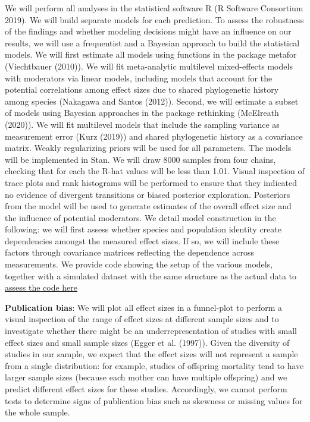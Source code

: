 \documentclass[]{article}
\begin{document}
We will perform all analyses in the statistical software R (R Software
Consortium 2019). We will build separate models for each prediction. To
assess the robustness of the findings and whether modeling decisions
might have an influence on our results, we will use a frequentist and a
Bayesian approach to build the statistical models. We will first
estimate all models using functions in the package metafor (Viechtbauer
(2010)). We will fit meta-analytic multilevel mixed-effects models with
moderators via linear models, including models that account for the
potential correlations among effect sizes due to shared phylogenetic
history among species (Nakagawa and Santos (2012)). Second, we will
estimate a subset of models using Bayesian approaches in the package
rethinking (McElreath (2020)). We will fit multilevel models that
include the sampling variance as measurement error (Kurz (2019)) and
shared phylogenetic history as a covariance matrix. Weakly regularizing
priors will be used for all parameters. The models will be implemented
in Stan. We will draw 8000 samples from four chains, checking that for
each the R-hat values will be less than 1.01. Visual inspection of trace
plots and rank histograms will be performed to ensure that they
indicated no evidence of divergent transitions or biased posterior
exploration. Posteriors from the model will be used to generate
estimates of the overall effect size and the influence of potential
moderators. We detail model construction in the following: we will first
assess whether species and population identity create dependencies
amongst the measured effect sizes. If so, we will include these factors
through covariance matrices reflecting the dependence across
measurements. We provide code showing the setup of the various models,
together with a simulated dataset with the same structure as the actual
data to
\href{https://github.com/dieterlukas/FemaleDominanceReproduction_MetaAnalysis}{assess
the code here}

\textbf{Publication bias}: We will plot all effect sizes in a
funnel-plot to perform a visual inspection of the range of effect sizes
at different sample sizes and to investigate whether there might be an
underrepresentation of studies with small effect sizes and small sample
sizes (Egger et al. (1997)). Given the diversity of studies in our
sample, we expect that the effect sizes will not represent a sample from
a single distribution: for example, studies of offspring mortality tend
to have larger sample sizes (because each mother can have multiple
offspring) and we predict different effect sizes for these studies.
Accordingly, we cannot perform tests to determine signs of publication
bias such as skewness or missing values for the whole sample.
\end{document}
